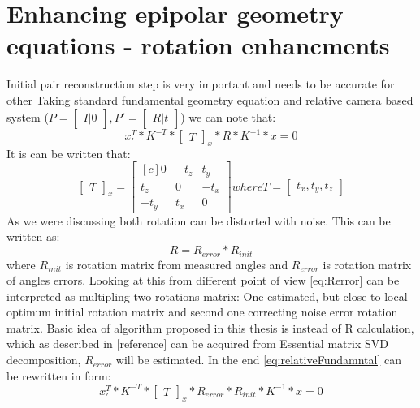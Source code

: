 \section{Enhancing epipolar geometry equations - rotation enhancments}
Initial pair reconstruction step is very important and needs to be accurate for other
Taking standard fundamental geometry equation and relative camera based system ($P = \begin{bmatrix}I |0\end{bmatrix}, P' = \begin{bmatrix}R|t\end{bmatrix}$) we can note that:
\begin{equation} \label{eq:relativeFundamntal}
{x}_{'}^{T} * K^{-T} * \begin{bmatrix}T\end{bmatrix}_{x} * R * K^{-1} * x = 0
\end{equation}
It is can be written that:
\begin{equation} \label{eq:skewTranslation}
\begin{bmatrix}T\end{bmatrix}_{x} = 
\begin{bmatrix*}[c]
 0 & -t_{z} & t_{y}\\
 t_{z} & 0 & -t_{x}\\
-t_{y} & t_{x} & 0 
\end{bmatrix*} 
where T = \begin{bmatrix}t_{x},t_{y},t_{z}\end{bmatrix}
\end{equation}
As we were discussing both rotation can be distorted with noise. This can be written as:
\begin{equation} \label{eq:Rerror}
R = R_{error} * R_{init} 
\end{equation}
where $R_{init}$ is rotation matrix from measured angles and $R_{error}$ is rotation matrix of angles errors.
Looking at this from different point of view \ref{eq:Rerror} can be interpreted as multipling two rotations matrix: 
One estimated, but close to local optimum initial rotation matrix and second one correcting noise error rotation matrix. 
Basic idea of algorithm proposed in this thesis is instead of R calculation, which as described in [reference] can be acquired from Essential matrix SVD decomposition, $R_{error}$ will be estimated. In the end \ref{eq:relativeFundamntal} can be rewritten in form:
\begin{equation} \label{eq:relativeFundamntalEnhanced}
{x}_{'}^{T} * K^{-T} * \begin{bmatrix}T\end{bmatrix}_{x} * R_{error} * R_{init} * K^{-1} * x = 0
\end{equation}
